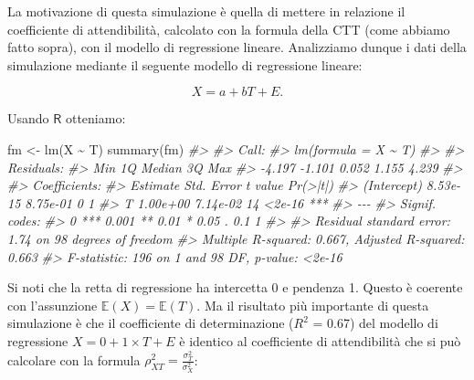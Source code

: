 \documentclass[
  11pt,
]{krantz}
\makeatletter
\newenvironment{Shaded}{\begin{snugshade}}{\end{snugshade}}
\newcommand{\CommentTok}[1]{\textcolor[rgb]{0.37,0.37,0.37}{\textit{#1}}}
\newcommand{\FunctionTok}[1]{\textcolor[rgb]{0,0,0}{#1}}
\newcommand{\NormalTok}[1]{#1}
\newcommand{\OtherTok}[1]{\textcolor[rgb]{0.37,0.37,0.37}{#1}}
\newcommand{\SpecialCharTok}[1]{\textcolor[rgb]{0,0,0}{#1}}
\newenvironment{kframe}{%
\medskip{}
\setlength{\fboxsep}{.8em}
 \def\at@end@of@kframe{}%
 \ifinner\ifhmode%
  \def\at@end@of@kframe{\end{minipage}}%
  \begin{minipage}{\columnwidth}%
 \fi\fi%
 \def\FrameCommand##1{\hskip\@totalleftmargin \hskip-\fboxsep
 \colorbox{shadecolor}{##1}\hskip-\fboxsep
     \hskip-\linewidth \hskip-\@totalleftmargin \hskip\columnwidth}%
 \MakeFramed {\advance\hsize-\width
   \@totalleftmargin\z@ \linewidth\hsize
   \@setminipage}}%
 {\par\unskip\endMakeFramed%
 \at@end@of@kframe}
\renewenvironment{Shaded}{\begin{kframe}}{\end{kframe}}
\newcommand{\E}{\mathbb{E}} %
\theoremstyle{definition}
\theoremstyle{definition}
\theoremstyle{definition}
\theoremstyle{definition}
\theoremstyle{remark}
\makeatother
\begin{document}
La motivazione di questa simulazione è quella di mettere in relazione il coefficiente di attendibilità, calcolato con la formula della CTT (come abbiamo fatto sopra), con il modello di regressione lineare. Analizziamo dunque i dati della simulazione mediante il seguente modello di regressione lineare:

\[
X = a + b T + E.
\]

Usando \(\textsf{R}\) otteniamo:

\begin{Shaded}
\begin{Highlighting}[]
\NormalTok{fm }\OtherTok{\textless{}{-}} \FunctionTok{lm}\NormalTok{(X }\SpecialCharTok{\textasciitilde{}}\NormalTok{ T)}
\FunctionTok{summary}\NormalTok{(fm)}
\CommentTok{\#\textgreater{} }
\CommentTok{\#\textgreater{} Call:}
\CommentTok{\#\textgreater{} lm(formula = X \textasciitilde{} T)}
\CommentTok{\#\textgreater{} }
\CommentTok{\#\textgreater{} Residuals:}
\CommentTok{\#\textgreater{}    Min     1Q Median     3Q    Max }
\CommentTok{\#\textgreater{} {-}4.197 {-}1.101  0.052  1.155  4.239 }
\CommentTok{\#\textgreater{} }
\CommentTok{\#\textgreater{} Coefficients:}
\CommentTok{\#\textgreater{}             Estimate Std. Error t value Pr(\textgreater{}|t|)    }
\CommentTok{\#\textgreater{} (Intercept) 8.53e{-}15   8.75e{-}01       0        1    }
\CommentTok{\#\textgreater{} T           1.00e+00   7.14e{-}02      14   \textless{}2e{-}16 ***}
\CommentTok{\#\textgreater{} {-}{-}{-}}
\CommentTok{\#\textgreater{} Signif. codes:  }
\CommentTok{\#\textgreater{} 0 \textquotesingle{}***\textquotesingle{} 0.001 \textquotesingle{}**\textquotesingle{} 0.01 \textquotesingle{}*\textquotesingle{} 0.05 \textquotesingle{}.\textquotesingle{} 0.1 \textquotesingle{} \textquotesingle{} 1}
\CommentTok{\#\textgreater{} }
\CommentTok{\#\textgreater{} Residual standard error: 1.74 on 98 degrees of freedom}
\CommentTok{\#\textgreater{} Multiple R{-}squared:  0.667,  Adjusted R{-}squared:  0.663 }
\CommentTok{\#\textgreater{} F{-}statistic:  196 on 1 and 98 DF,  p{-}value: \textless{}2e{-}16}
\end{Highlighting}
\end{Shaded}

Si noti che la retta di regressione ha intercetta 0 e pendenza 1. Questo è coerente con l'assunzione \(\E(X) = \E(T)\). Ma il risultato più importante di questa simulazione è che il coefficiente di determinazione (\(R^2\) = 0.67) del modello di regressione \(X = 0 + 1 \times T + E\) è identico al coefficiente di attendibilità che si può calcolare con la formula \(\rho_{XT}^2 = \frac{\sigma_{T}^2}{\sigma_X^2}\):
\end{document}
